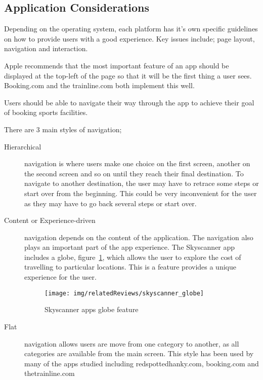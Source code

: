 \subsection{Application Considerations}
\label{sub:application_considerations}

Depending on the operating system, each platform has it's own specific
guidelines on how to provide users with a good experience. Key issues include;
page layout, navigation and interaction.

Apple recommends that the most important feature of an app should be displayed
at the top-left of the page so that it will be the first thing a user
sees\cite{HIGApple2013}.  Booking.com and the trainline.com both implement this
well\cite{BookingcomIOS}.

Users should be able to navigate their way through the app to achieve their
goal of booking sports facilities.

There are 3 main styles of navigation;
\begin{description}
	\item[Hierarchical] navigation is where users make one choice on the first
		screen, another on the second screen and so on until they reach their
		final destination. To navigate to another destination, the user may
		have to retrace some steps or start over from the beginning. This could
		be very inconvenient for the user as they may have to go back several
		steps or start over.
	\item[Content or Experience-driven] navigation depends on the content of
		the application. The navigation also plays an important part of the app
		experience. The Skyscanner app includes a globe,
		figure~\ref{fig:skyscanner_globe}, which allows the user to explore the
		cost of travelling to particular locations. This is a feature provides
		a unique experience for the user.
		\begin{figure}[htbp]
			\begin{center}
				\texttt{[image: img/relatedReviews/skyscanner\_globe]}
			\end{center}
			\caption{Skyscanner apps globe feature}\label{fig:skyscanner_globe}
		\end{figure}

	\item[Flat] navigation allows users are move from one category to another,
		as all categories are available from the main screen. This style has
		been used by many of the apps studied including redspottedhanky.com,
		booking.com and thetrainline.com
\end{description}

